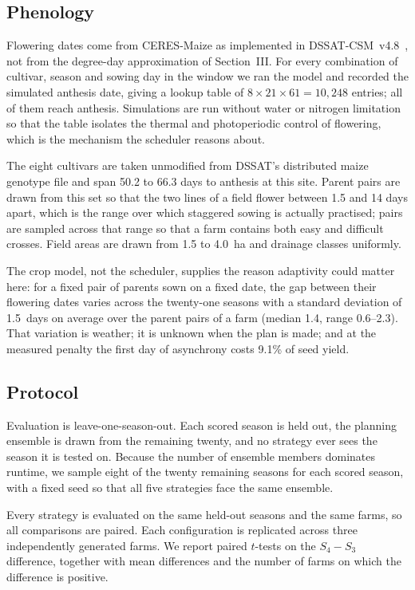 \documentclass[10pt,twocolumn]{article}
\begin{document}
\subsection{Phenology}

Flowering dates come from CERES-Maize as implemented in
DSSAT-CSM~v4.8~\cite{dssat}, not from the degree-day approximation of
Section~III. For every combination of cultivar, season and sowing day in the
window we ran the model and recorded the simulated anthesis date, giving a
lookup table of $8 \times 21 \times 61 = 10{,}248$ entries; all of them reach
anthesis. Simulations are run without water or nitrogen limitation so that
the table isolates the thermal and photoperiodic control of flowering, which
is the mechanism the scheduler reasons about.

The eight cultivars are taken unmodified from DSSAT's distributed maize
genotype file and span 50.2 to 66.3 days to anthesis at this site. Parent
pairs are drawn from this set so that the two lines of a field flower between
1.5 and 14 days apart, which is the range over which staggered sowing is
actually practised; pairs are sampled across that range so that a farm
contains both easy and difficult crosses. Field areas are drawn from 1.5 to
4.0~ha and drainage classes uniformly.

The crop model, not the scheduler, supplies the reason adaptivity could
matter here: for a fixed pair of parents sown on a fixed date, the gap between
their flowering dates varies across the twenty-one seasons with a standard
deviation of 1.5~days on average over the parent pairs of a farm (median 1.4,
range 0.6--2.3). That variation is weather; it is unknown when the plan is
made; and at the measured penalty the first day of asynchrony costs 9.1\% of
seed yield.

\subsection{Protocol}

Evaluation is leave-one-season-out. Each scored season is held out, the
planning ensemble is drawn from the remaining twenty, and no strategy ever
sees the season it is tested on. Because the number of ensemble members
dominates runtime, we sample eight of the twenty remaining seasons for each
scored season, with a fixed seed so that all five strategies face the same
ensemble.

Every strategy is evaluated on the same held-out seasons and the same farms,
so all comparisons are paired. Each configuration is replicated across three
independently generated farms. We report paired $t$-tests on the $S_4 - S_3$
difference, together with mean differences and the number of farms on which
the difference is positive.
\end{document}
